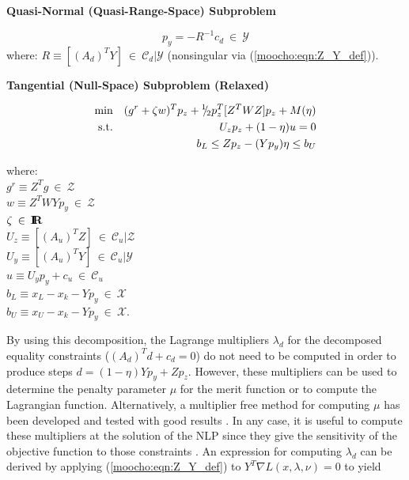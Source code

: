 \documentclass[pdf,ps2pdf,11pt]{SANDreport}
\begin{document}
{\bsinglespace
\begin{center}\textbf{Quasi-Normal (Quasi-Range-Space) Subproblem}\end{center}
\begin{equation}
p_y = - R^{-1} c_d \:\in\:\mathcal{Y}
\label{moocho:eqn:range_space_step}
\end{equation}
\hspace{4ex}where: $R \equiv [(A_d)^T Y]  \:\in\:\mathcal{C}_d|\mathcal{Y}$
	(nonsingular via (\ref{moocho:eqn:Z_Y_def})). \\[2ex]

\begin{center}\textbf{Tangential (Null-Space) Subproblem (Relaxed)}\end{center}
\begin{eqnarray}
\mbox{min}  &  & (g^r + \zeta w)^T p_z + {}^1 \!\! / \! {}_2 p_z^T [Z^T W Z] p_z + M(\eta)
                 \label{moocho:eqn:moocho:obj} \\
\mbox{s.t.} &  & U_z p_z + (1-\eta) u = 0 
                 \label{moocho:eqn:moocho:equ} \\
            &  & b_L \leq Z p_z - (Y p_y) \eta \leq b_U	
                 \label{moocho:eqn:moocho:inequ}
\end{eqnarray}
\begin{tabbing}
\hspace{4ex}where:\hspace{5ex}\= \\
\>	$g^r \equiv Z^T g \:\in\:\mathcal{Z}$ \\
\>	$w \equiv Z^T W Y p_y \:\in\:\mathcal{Z}$ \\
\>	$\zeta \:\in\:\mbox{\textbf{I}}\hspace{-0.6ex}\mbox{\textbf{R}}$ \\
\>	$U_z \equiv [(A_u)^T Z] \:\in\:\mathcal{C}_u|\mathcal{Z}$ \\
\>	$U_y \equiv [(A_u)^T Y] \:\in\:\mathcal{C}_u|\mathcal{Y}$ \\
\>  $u   \equiv U_y p_y + c_u \:\in\:\mathcal{C}_u$ \\
\>	$b_L \equiv x_L - x_k - Y p_y \:\in\:\mathcal{X}$ \\
\>	$b_U \equiv x_U - x_k - Y p_y \:\in\:\mathcal{X}$.
\end{tabbing}
\esinglespace}

By using this decomposition, the Lagrange multipliers $\lambda_d$ for the
decomposed equality constraints ($(A_d)^T d + c_d = 0$) do not need to be
computed in order to produce steps $d = (1-\eta) Y p_y + Z p_z$.  However,
these multipliers can be used to determine the penalty parameter $\mu$ for the
merit function {}\cite[page 544]{ref:nocedal_wright_1999} or to compute the
Lagrangian function.  Alternatively, a multiplier free method for computing
$\mu$ has been developed and tested with good results
{}\cite{ref:schmid_rsqp_1994}.  In any case, it is useful to compute these
multipliers at the solution of the NLP since they give the sensitivity of the
objective function to those constraints {}\cite[page
436]{ref:nash_sofer_1996}.  An expression for computing $\lambda_d$ can be
derived by applying (\ref{moocho:eqn:Z_Y_def}) to $Y^T \nabla
L(x,\lambda,\nu)=0$ to yield
\end{document}

